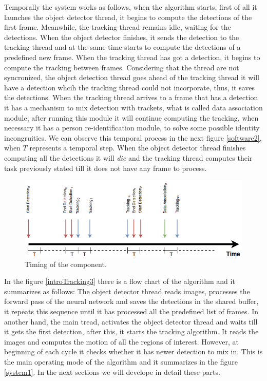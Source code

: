 Temporally the system works as follows, when the algorithm starts, first of all it launches the object detector thread, it begins to compute the detections of the first frame. Meanwhile, the tracking thread remains idle, waiting for the detections. When the object detector finishes, it sends the detection to the tracking thread and at the same time starts to compute the detections of a predefined new frame. When the tracking thread has got a detection, it begins to compute the tracking between frames. Considering that the thread are not syncronized, the object detection thread goes ahead of the tracking thread it will have a detection whcih the tracking thread could not incorporate, thus, it saves the detections. When the tracking thread arrives to a frame that has a detection it has a mechanism to mix detection with trackets, what is called data association module, after running this module it will continue computing the tracking, when necessary it has a person re-identification module, to solve some possible identity incongruities. We can observe this temporal process in the next figure \ref{software2}, when $T$ represents a temporal step. When the object detector thread finishes computing all the detections it will \textit{die} and the tracking thread computes their task previously stated till it does not have any frame to process.


\begin{figure}[H]
\centering         
\includegraphics[width=14cm]{timesDiagram/timing.png}
\caption{Timing of the component.} \label{intro1}
\end{figure}


In the figure \ref{introTracking3} there is a flow chart of the algorithm and it summarizes as follows: The object detector thread reads images, processes the forward pass of the neural network and saves the detections in the shared buffer, it repeats this sequence until it has processed all the predefined list of frames. In another hand, the main tread, activates the object detector thread and waits till it gets the first detection, after this, it starts the tracking algorithm. It reads the images and computes the motion of all the regions of interest. However, at beginning of each cycle it checks whether it has newer detection to mix in. This is the main operating mode of the algorithm and it summarizes in the figure \ref{system1}. In the next sections we will develope in detail these parts. 

